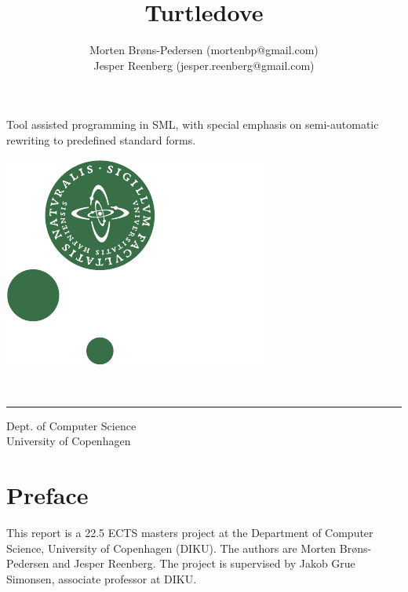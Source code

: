 \documentclass[a4paper, oneside, final]{memoir}
\title{Turtledove}
\author{Morten Brøns-Pedersen {\footnotesize{(mortenbp@gmail.com)}}\\  
Jesper Reenberg \footnotesize{(jesper.reenberg@gmail.com)}}
\makeatletter
\theoremstyle{definition}
\def\maketitle{%
  \null
  \thispagestyle{empty}%
  \vfill
  \begin{center}\leavevmode
    \normalfont
    \Huge{\raggedleft \@title\par}%
    \hrulefill\par
    \Large{\raggedright \subtitle\par}%
    \vskip 2cm
    {\@date\par}%
  \end{center}%
  \vfill
\begin{minipage}{80pt}
\includegraphics*[scale=0.75]{imgs/nat-logo}
\end{minipage}
\begin{minipage}{300pt}
  \begin{flushleft}
    {\large \@author } \\
    {\footnotesize \suplementInfo }

  \end{flushleft}
\end{minipage}
\cleardoublepage %
  \clearpage %
}
\def\subtitle{\footnotesize{Tool assisted programming in SML, with special emphasis on semi-automatic rewriting to
predefined standard forms.}}
\def\suplementInfo{
  \kern 5pt \hrule width 11pc \kern 5pt %
  Dept. of Computer Science \\
  University of Copenhagen}
\makeatother
\begin{document}
\frontmatter

\maketitle
\thispagestyle{empty}

\begin{abstract}

\end{abstract}

\clearpage 
\chapter*{Preface}
This report is a 22.5 ECTS masters project at the Department of Computer
Science, University of Copenhagen (DIKU). The authors are Morten Brøns-Pedersen
and Jesper Reenberg. The project is supervised by Jakob Grue Simonsen, associate
professor at DIKU.

\clearpage

\tableofcontents*

\mainmatter


























\appendix



\end{document}
